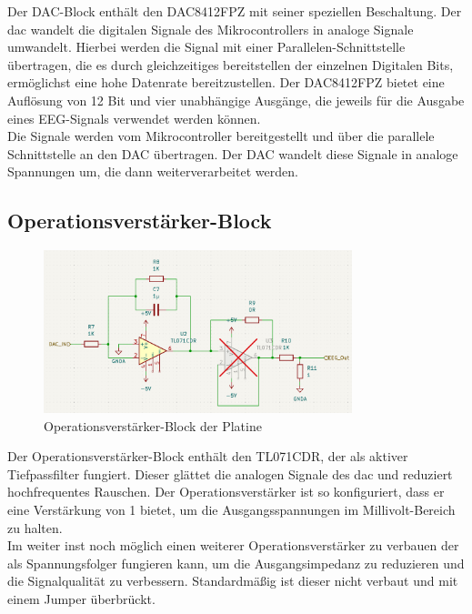 Der DAC-Block enthält den DAC8412FPZ mit seiner speziellen Beschaltung.
Der \gls{dac} wandelt die digitalen Signale des Mikrocontrollers in analoge Signale umwandelt. Hierbei werden die Signal mit einer Parallelen-Schnittstelle übertragen, die es durch gleichzeitiges bereitstellen der einzelnen Digitalen Bits, ermöglichst eine hohe Datenrate bereitzustellen. Der DAC8412FPZ bietet eine Auflösung von 12 Bit und vier unabhängige Ausgänge, die jeweils für die Ausgabe eines EEG-Signals verwendet werden können.\\
Die Signale werden vom Mikrocontroller bereitgestellt und über die parallele Schnittstelle an den DAC übertragen. Der DAC wandelt diese Signale in analoge Spannungen um, die dann weiterverarbeitet werden.\\

\subsection{Operationsverstärker-Block}
\begin{figure}[H]
    \centering
    \includegraphics[width=0.8\textwidth]{bilder/Operationsverstaerker_Block.png}
    \caption{Operationsverstärker-Block der Platine}
    \label{fig:operationsverstaerker_block}
\end{figure}

Der Operationsverstärker-Block enthält den TL071CDR, der als aktiver Tiefpassfilter fungiert. Dieser glättet die analogen Signale des \gls{dac} und reduziert hochfrequentes Rauschen. Der Operationsverstärker ist so konfiguriert, dass er eine Verstärkung von 1 bietet, um die Ausgangsspannungen im Millivolt-Bereich zu halten.\\
Im weiter inst noch möglich einen weiterer Operationsverstärker zu verbauen der als Spannungsfolger fungieren kann, um die Ausgangsimpedanz zu reduzieren und die Signalqualität zu verbessern. Standardmäßig ist dieser nicht verbaut und mit einem Jumper überbrückt. 

